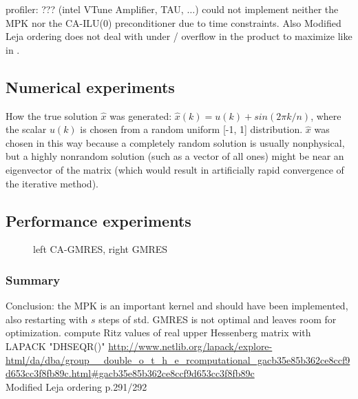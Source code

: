 \documentclass{scrartcl}
\begin{document}
 profiler: ??? (intel VTune Amplifier, TAU, $\ldots$) could not implement neither the MPK nor the CA-ILU(0) preconditioner due to time constraints. Also Modified Leja ordering does not deal with under / overflow in the product to maximize like in \cite{Hoemmen:2010:CKS:1970638}.
\subsection{Numerical experiments}

How the true solution $\hat{x}$ was generated: $\hat{x}(k) = u(k) + sin(2\pi k/n)$,
where the scalar $u(k)$ is chosen from a random uniform [-1, 1] distribution. 
$\hat{x}$ was chosen in this way because a completely random solution is usually nonphysical, but a highly nonrandom solution (such as a vector of all ones) might be near an eigenvector of the matrix (which would result in artificially rapid convergence of the iterative method).

\begin{center}
	\resizebox{1.0\textwidth}{!}{}
	\resizebox{1.0\textwidth}{!}{}
	\resizebox{1.0\textwidth}{!}{}
	\resizebox{1.0\textwidth}{!}{}
	\resizebox{1.0\textwidth}{!}{}
	\resizebox{1.0\textwidth}{!}{}
\end{center}


\subsection{Performance experiments}
\begin{figure}[H]
\centering
	\resizebox{1.0\textwidth}{!}{}
\caption{left CA-GMRES, right GMRES}
\end{figure}
\subsubsection{Summary}
Conclusion: the MPK is an important kernel and should have been implemented, also restarting with $s$ steps of std. GMRES is not optimal and leaves room for optimization.
\iffalse
compute Ritz values of real upper Hessenberg matrix with LAPACK "DHSEQR()"
\url{http://www.netlib.org/lapack/explore-html/da/dba/group__double_o_t_h_e_rcomputational_gacb35e85b362ce8ccf9d653cc3f8fb89c.html#gacb35e85b362ce8ccf9d653cc3f8fb89c}
\\

Modified Leja ordering \cite{Hoemmen:2010:CKS:1970638} p.291/292\\
\end{document}
